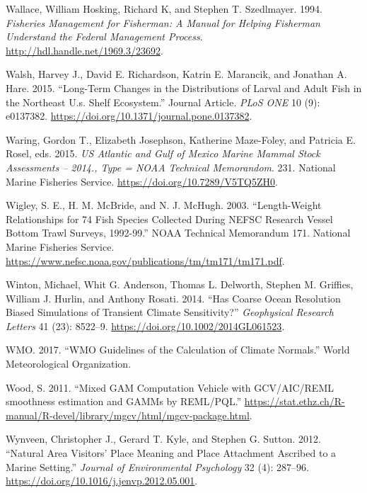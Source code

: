 \documentclass[
]{book}
\newlength{\cslhangindent}
\newenvironment{cslreferences}%
  {\setlength{\parindent}{0pt}%
  \everypar{\setlength{\hangindent}{\cslhangindent}}\ignorespaces}%
  {\par}
\begin{document}
\begin{cslreferences}
\leavevmode\hypertarget{ref-wallace1994}{}%
Wallace, William Hosking, Richard K, and Stephen T. Szedlmayer. 1994. \emph{Fisheries Management for Fisherman: A Manual for Helping Fisherman Understand the Federal Management Process}. \url{http://hdl.handle.net/1969.3/23692}.

\leavevmode\hypertarget{ref-RN126}{}%
Walsh, Harvey J., David E. Richardson, Katrin E. Marancik, and Jonathan A. Hare. 2015. ``Long-Term Changes in the Distributions of Larval and Adult Fish in the Northeast U.s. Shelf Ecosystem.'' Journal Article. \emph{PLoS ONE} 10 (9): e0137382. \url{https://doi.org/10.1371/journal.pone.0137382}.

\leavevmode\hypertarget{ref-waring_us_2015}{}%
Waring, Gordon T., Elizabeth Josephson, Katherine Maze-Foley, and Patricia E. Rosel, eds. 2015. \emph{US Atlantic and Gulf of Mexico Marine Mammal Stock Assessments -- 2014., Type = NOAA Technical Memorandom}. 231. National Marine Fisheries Service. \url{https://doi.org/10.7289/V5TQ5ZH0}.

\leavevmode\hypertarget{ref-wigley_length-weight_2003}{}%
Wigley, S. E., H. M. McBride, and N. J. McHugh. 2003. ``Length-Weight Relationships for 74 Fish Species Collected During NEFSC Research Vessel Bottom Trawl Surveys, 1992-99.'' NOAA Technical Memorandum 171. National Marine Fisheries Service. \url{https://www.nefsc.noaa.gov/publications/tm/tm171/tm171.pdf}.

\leavevmode\hypertarget{ref-winton_has_2014}{}%
Winton, Michael, Whit G. Anderson, Thomas L. Delworth, Stephen M. Griffies, William J. Hurlin, and Anthony Rosati. 2014. ``Has Coarse Ocean Resolution Biased Simulations of Transient Climate Sensitivity?'' \emph{Geophysical Research Letters} 41 (23): 8522--9. \url{https://doi.org/10.1002/2014GL061523}.

\leavevmode\hypertarget{ref-WMO2017}{}%
WMO. 2017. ``WMO Guidelines of the Calculation of Climate Normals.'' World Meteorological Organization.

\leavevmode\hypertarget{ref-Wood2011a}{}%
Wood, S. 2011. ``Mixed GAM Computation Vehicle with GCV/AIC/REML smoothness estimation and GAMMs by REML/PQL.'' \url{https://stat.ethz.ch/R-manual/R-devel/library/mgcv/html/mgcv-package.html}.

\leavevmode\hypertarget{ref-wynveen_natural_2012}{}%
Wynveen, Christopher J., Gerard T. Kyle, and Stephen G. Sutton. 2012. ``Natural Area Visitors' Place Meaning and Place Attachment Ascribed to a Marine Setting.'' \emph{Journal of Environmental Psychology} 32 (4): 287--96. \url{https://doi.org/10.1016/j.jenvp.2012.05.001}.


\end{cslreferences}
\end{document}
